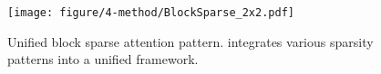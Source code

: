 \begin{figure}[t]
    \centering
    \texttt{[image: figure/4-method/BlockSparse\_2x2.pdf]}
    \caption{Unified block sparse attention pattern. \system integrates various sparsity patterns into a unified framework. 
    }
    \label{fig:method:blocksparse}
\end{figure}
